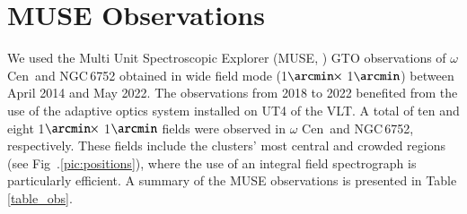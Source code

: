 \documentclass{aa}
\newcommand{\Cen}{$\omega$ Cen}
\begin{document}
\section{MUSE Observations}
\label{sec:obs}

We used the Multi Unit Spectroscopic Explorer (MUSE, \citealt{bacon2010}) GTO observations of \Cen\ and NGC\,6752 obtained in wide field mode (1$\arcmin \times$ 1$\arcmin$) between April 2014 and May 2022. The observations from 2018 to 2022 benefited from the use of the adaptive optics system installed on UT4 of the VLT.
A total of ten and eight 1$\arcmin \times$ 1$\arcmin$ fields were observed in \Cen\ and NGC\,6752, respectively. These fields include the clusters' most central and crowded regions (see Fig~.\ref{pic:positions}), where the use of an integral field spectrograph is particularly efficient. A summary of the MUSE observations is presented in Table 
\ref{table_obs}. 
\end{document}
